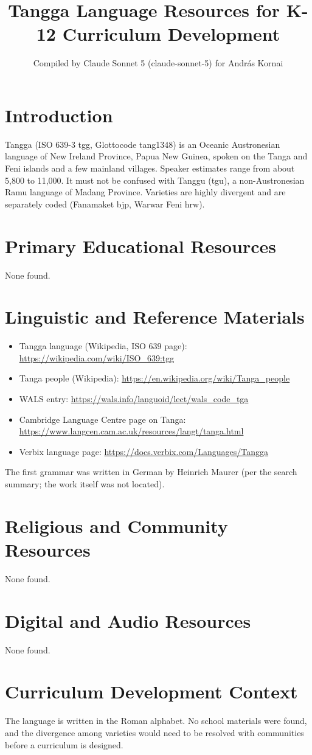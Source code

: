 \documentclass[12pt]{article}
\title{Tangga Language Resources for K-12 Curriculum Development}
\author{Compiled by Claude Sonnet 5 (claude-sonnet-5) for Andr\'as Kornai}
\date{}
\begin{document}
\maketitle

\section{Introduction}
Tangga (ISO 639-3 tgg, Glottocode tang1348) is an Oceanic Austronesian language of New Ireland Province, Papua New Guinea, spoken on the Tanga and Feni islands and a few mainland villages. Speaker estimates range from about 5,800 to 11,000. It must not be confused with Tanggu (tgu), a non-Austronesian Ramu language of Madang Province. Varieties are highly divergent and are separately coded (Fanamaket bjp, Warwar Feni hrw).

\section{Primary Educational Resources}
None found.

\section{Linguistic and Reference Materials}
\begin{itemize}
\item Tangga language (Wikipedia, ISO 639 page): \url{https://wikipedia.com/wiki/ISO_639:tgg}
\item Tanga people (Wikipedia): \url{https://en.wikipedia.org/wiki/Tanga_people}
\item WALS entry: \url{https://wals.info/languoid/lect/wals_code_tga}
\item Cambridge Language Centre page on Tanga: \url{https://www.langcen.cam.ac.uk/resources/langt/tanga.html}
\item Verbix language page: \url{https://docs.verbix.com/Languages/Tangga}
\end{itemize}
The first grammar was written in German by Heinrich Maurer (per the search summary; the work itself was not located).

\section{Religious and Community Resources}
None found.

\section{Digital and Audio Resources}
None found.

\section{Curriculum Development Context}
The language is written in the Roman alphabet. No school materials were found, and the divergence among varieties would need to be resolved with communities before a curriculum is designed.
\end{document}
